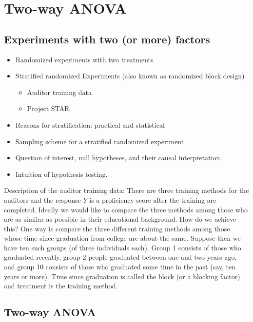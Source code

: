 \documentclass[12pt,]{book}
\providecommand{\tightlist}{%
  \setlength{\itemsep}{0pt}\setlength{\parskip}{0pt}}
\begin{document}
\chapter{Two-way ANOVA}\label{ch:anovaII}

\section{Experiments with two (or more)
factors}\label{experiments-with-two-or-more-factors}

\begin{itemize}
\tightlist
\item
  Randomized experiments with two treatments
\item
  Stratified randomized Experiments (also known as randomized block
  design)

  \begin{itemize}
  \tightlist
  \item
    Auditor training data
  \item
    Project STAR
  \end{itemize}
\item
  Reasons for stratification: practical and statistical
\item
  Sampling scheme for a stratified randomized experiment
\item
  Question of interest, null hypotheses, and their causal
  interpretation.
\item
  Intuition of hypothesis testing.
\end{itemize}

Description of the auditor training data: There are three training
methods for the auditors and the response \(Y\) is a proficiency score
after the training are completed. Ideally we would like to compare the
three methods among those who are as similar as possible in their
educational background. How do we achieve this? One way is compare the
three different training methods among those whose time since graduation
from college are about the same. Suppose then we have ten such groups
(of three individuals each). Group 1 consists of those who graduated
recently, group 2 people graduated between one and two years ago, and
group 10 consists of those who graduated some time in the past (say, ten
years or more). Time since graduation is called the block (or a blocking
factor) and treatment is the training method.

\section{Two-way ANOVA}\label{two-way-anova}
\end{document}
